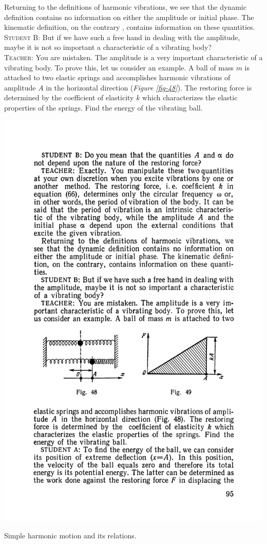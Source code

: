 \documentclass[a4paper,sfsidenotes]{tufte-book}
\begin{document}
Returning to the definitions of harmonic vibrations, we see that the dynamic definition contains no information on either the amplitude or initial phase. The kinematic definition, on the contrary , contains information on these quantities.
\\
\textsc{Student B:} But if we have such a free hand in dealing with the amplitude, maybe it is not so important a characteristic of a vibrating body?
\\
\textsc{Teacher:} You are mistaken. The amplitude is a very important characteristic of a vibrating body. To prove this, let us consider an example. A ball of mass $m$ is attached to two elastic springs and accomplishes harmonic vibrations of amplitude $A$ in the horizontal direction (\emph{Figure \ref{fig-48}}). The restoring force is determined by the coefficient of elasticity $k$ which characterizes the elastic properties of the springs. Find the energy of the vibrating ball.
\begin{marginfigure}
\centering
\includegraphics[width=0.8\linewidth]{fig-048a.pdf}
\caption{Simple harmonic motion and its relations.}
\label{fig-48}
\end{marginfigure}
\end{document}
